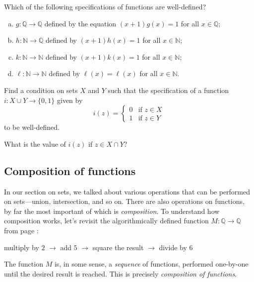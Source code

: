 \begin{exercise}
Which of the following specifications of functions are well-defined?
\begin{enumerate}[(a)]
\item $g : \mathbb{Q} \to \mathbb{Q}$ defined by the equation $(x+1)g(x)=1$ for all $x \in \mathbb{Q}$;
\item $h : \mathbb{N} \to \mathbb{Q}$ defined by $(x+1)h(x)=1$ for all $x \in \mathbb{N}$;
\item $k : \mathbb{N} \to \mathbb{N}$ defined by $(x+1)k(x)=1$ for all $x \in \mathbb{N}$;
\item $\ell : \mathbb{N} \to \mathbb{N}$ defined by $\ell(x)=\ell(x)$ for all $x \in \mathbb{N}$.
\end{enumerate}
\end{exercise}

\begin{exercise}
\label{exWellDefinednessOfFunctionOnUnion}
Find a condition on sets $X$ and $Y$ such that the specification of a function $i : X \cup Y \to \{ 0, 1 \}$ given by
\[ i(z) = \begin{cases} 0 & \text{if } z \in X \\ 1 & \text{if } z \in Y \end{cases} \]
to be well-defined.
\begin{backhint}
What is the value of $i(z)$ if $z \in X \cap Y$?
\end{backhint}
\end{exercise}

\subsection*{Composition of functions}

In our section on sets, we talked about various operations that can be performed on sets---union, intersection, and so on. There are also operations on functions, by far the most important of which is \textit{composition}. To understand how composition works, let's revisit the algorithmically defined function $M : \mathbb{Q} \to \mathbb{Q}$ from page \pageref{txtAlgorithmicallyDefinedFunctionExample}:
\begin{center}
multiply by $2$ $\to$ add $5$ $\to$ square the result $\to$ divide by $6$
\end{center}
The function $M$ is, in some sense, a \textit{sequence} of functions, performed one-by-one until the desired result is reached. This is precisely \textit{composition of functions}.

